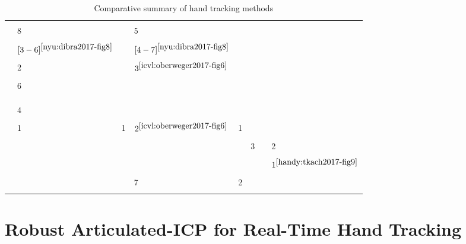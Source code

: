 {\begin{longtable}{| l | l | l | l | l | l | l | l |}
\hline & & & & & & & \\[-1.2em]
%
\cite{fourure2017multi} & 8&	&	5&	&	&	&	 \\
\hline & & & & & & & \\[-1.2em]
%
\cite{dibra2017refine} & $[3-6]^{\ref{nyu:dibra2017-fig8}}$ &	&	$[4-7]^{\ref{nyu:dibra2017-fig8}}$ &	&	&	&	\\
\hline & & & & & & & \\[-1.2em]
%
\cite{guo2017region} & 2&	&	$3^{\ref{icvl:oberweger2017-fig6}}$ &	&	&	&	\\
\hline & & & & & & & \\[-1.2em]
%
\cite{madadi2017end} & 6&	&	&	&	&	&	\\
\hline & & & & & & & \\[-1.2em]
%
\cite{mueller2017real} & &	&	&	&	&	&	\\
\hline & & & & & & & \\[-1.2em]
%
\cite{neverova2017hand} & 4&	&	&	&	&	&	\\
\hline & & & & & & & \\[-1.2em]
%
\cite{oberweger2017deepprior++} & 1&	1&	$2^{\ref{icvl:oberweger2017-fig6}}$ &	1&	&	&	\\
\hline & & & & & & & \\[-1.2em]
%
\cite{taylor2017articulated} & &	&	&	&	3&	&	2\\
\hline & & & & & & & \\[-1.2em]
%
\cite{tkach2017online} & &	&	&	&	&	&	$1^{\ref{handy:tkach2017-fig9}}$\\
\hline & & & & & & & \\[-1.2em]
%
\cite{wan2017crossing} & &	&	7&	2&	&	&	\\
\hline

\caption{Comparative summary of hand tracking methods} %
\label{tab:methods_accuracy}
\end{longtable}
}


\chapter{Robust Articulated-ICP for Real-Time Hand Tracking} \label{ch:tracking}












